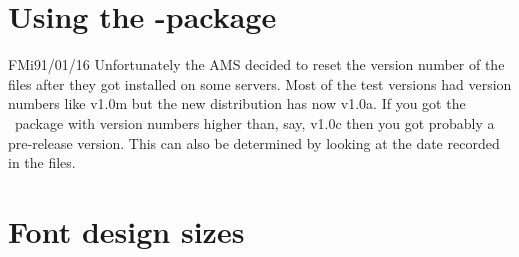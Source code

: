\section{Using the {\protect\amslatex} -package}

\begin{comment}{TF}{91/01/02}
  If you are using the {\tt amssymb.sty}-file
  (containing only the definitions for the mathematical
  symbols and not the whole \amslatex -stuff) maybe you
  will get an error message that the macros \verb'\RifM@'
  and \verb'\noaccents@' aren't defined.

  In this case you probably work with version 1.0p of
  {\tt amssymb.sty} (which is a not correct running
  testversion).

  Although you can work around this bug by making a
  private copy of {\tt amssymb.sty} and copying the
  definitions from {\tt amstex.sty} which look like:
\begin{verbatim}
   \def\RIfM@{\relax\protect\ifmmode}
   \def\noaccents@{\def\accentclass@{0}}
\end{verbatim}
  you should better try to get version 1.0a of {\tt
  amssymb.sty} which should run correctly.
\end{comment}
\begin{remark}{FMi}{91/01/16}
 Unfortunately the AMS decided to reset the version number of
 the files after they got installed on some servers.
 Most of the test versions had version numbers like v1.0m
 but the new distribution has now v1.0a. If you got the \amslatex\
 package with version numbers higher than, say, v1.0c then you got
 probably a pre-release version.
 This can also be determined by looking at the date recorded
 in the files.
\end{remark}

\section{Font design sizes}


